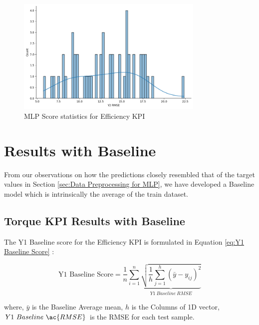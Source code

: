 \documentclass{report} %
\begin{document}
\begin{figure}[H]
    \centering
    \includegraphics[width=0.8\textwidth]{./ReportImages/score_MLP_y2.png } 
    \caption{MLP Score statistics for Efficiency \ac{KPI}} 
    \label{fig:MLP Score statistics for 3D KPI(Efficiency)}
\end{figure}

\section{Results with Baseline}\label{sec:Results with Baseline}

From our observations on how the predictions closely resembled that of the target values in Section \ref{sec:Data Preprocessing for MLP}, we have developed a Baseline model which is intrinsically the average of the train dataset.

\subsection{Torque \ac{KPI} Results with Baseline}\label{sec:3D Efficiency Grid Results with Baseline}

The Y1 Baseline score for the Efficiency \ac{KPI} is formulated in Equation \ref{eq:Y1 Baseline Score} :

\begin{equation}
    \text{Y1 Baseline Score} = \frac{1}{n} \sum_{i=1}^{n} \underbrace{ \sqrt{\frac{1}{h} \sum_{j=1}^{h} (\bar{y} - y_{ij})^2}}_{Y1\ Baseline\ RMSE}
    \label{eq:Y1 Baseline Score}
\end{equation}
    
where, \(\bar{y}\) is the Baseline Average mean, \(h\) is the Columns of 1D vector, \(Y1\ Baseline\ \ac{RMSE}\) is the \ac{RMSE} for each test sample.
    

\vspace{1em} %
\end{document}
